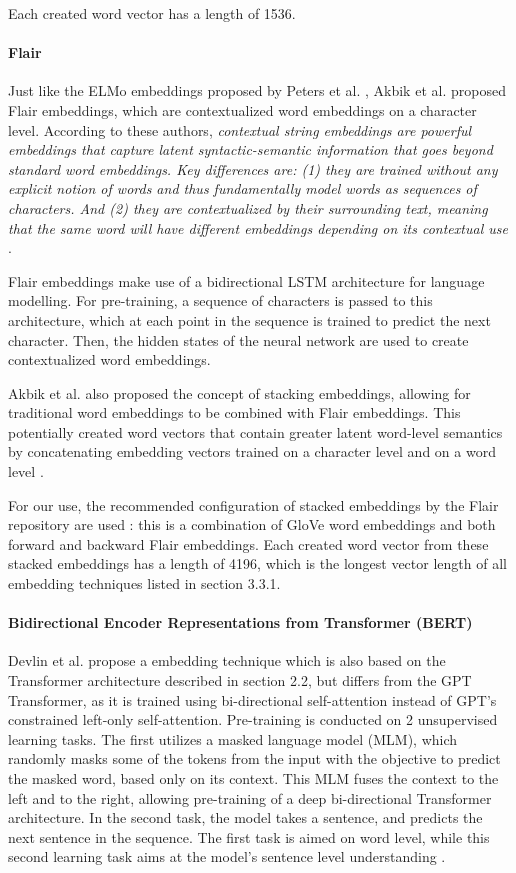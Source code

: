 Each created word vector has a length of 1536.

\paragraph{Flair}
Just like the ELMo embeddings proposed by Peters et al. \cite{peters2018}, Akbik et al. proposed Flair embeddings, which are contextualized word embeddings on a character level.
According to these authors, \textit{contextual string embeddings are powerful embeddings that capture latent syntactic-semantic information that goes beyond standard word embeddings. 
Key differences are: (1) they are trained without any explicit notion of words and thus fundamentally model words as sequences of characters. 
And (2) they are contextualized by their surrounding text, meaning that the same word will have different embeddings depending on its contextual use} \cite{flairembedding}. 

Flair embeddings make use of a bidirectional LSTM architecture for language modelling. 
For pre-training, a sequence of characters is passed to this architecture, which at each point in the sequence is trained to predict the next character.
Then, the hidden states of the neural network are used to create contextualized word embeddings.

Akbik et al. also proposed the concept of stacking embeddings, allowing for traditional word embeddings to be combined with Flair embeddings.
This potentially created word vectors that contain greater latent word-level semantics by concatenating embedding vectors trained on a character level and on a word level \cite{akbik2018}.

For our use, the recommended configuration of stacked embeddings by the Flair repository are used \cite{flairembedding}: this is a combination of GloVe word embeddings \cite{pennington2014} and both forward and backward Flair embeddings.
Each created word vector from these stacked embeddings has a length of 4196, which is the longest vector length of all embedding techniques listed in section 3.3.1. 

\paragraph{Bidirectional Encoder Representations from Transformer (BERT)}
Devlin et al. propose a embedding technique which is also based on the Transformer architecture described in section 2.2, but differs from the GPT Transformer, as it is trained using bi-directional self-attention instead of GPT's constrained left-only self-attention.
Pre-training is conducted on 2 unsupervised learning tasks. 
The first utilizes a masked language model (MLM), which randomly masks some of the tokens from the input with the objective to predict the masked word, based only on its context.
This MLM fuses the context to the left and to the right, allowing pre-training of a deep bi-directional Transformer architecture.
In the second task, the model takes a sentence, and predicts the next sentence in the sequence. 
The first task is aimed on word level, while this second learning task aims at the model's sentence level understanding \cite{devlin2018}. 

